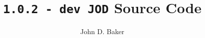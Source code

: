 %
%
%
%



\author{John D. Baker}
\title{\texttt{1.0.2 - dev JOD} Source Code}

\setlength{\columnsep}{3em}
\setlength{\columnseprule}{0.5pt}
\twocolumn

\maketitle
\tableofcontents
\onecolumn

\newpage


\newpage


\newpage


\newpage


\newpage


\newpage


%

\newpage
{}
{}
\printindex


